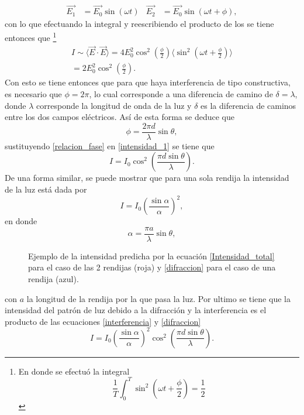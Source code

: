 \documentclass[%
 reprint,
 amsmath,amssymb,
 aps,
]{revtex4-1}
\begin{document}
\begin{align}
\vec{E_1}&=\vec{E_0}\sin(\omega t)   &  \vec{E_2}&=\vec{E_0}\sin(\omega t+ \phi),
\label{campos electricos}
\end{align}
con lo que efectuando la integral y reescribiendo el producto de los  se tiene entonces que \footnote{En donde se efectuó la integral
\[ \frac{1}{T}\int_{0}^{T}\sin^2\left(\omega t+\frac{\phi}{2}\right)=\frac{1}{2}\]
}
\begin{multline}
I\sim  \langle \vec{E}\cdot \vec{E}\rangle = 4E_0^2 \cos^2\left(\frac{\phi}{2}\right)\langle\sin^2\left(\omega t+\frac{\phi}{2}\right)\rangle \\
=2E_0^2\cos^2\left(\frac{\phi}{2}\right).
\label{intensidad_1}
\end{multline}
Con esto se tiene entonces que para que haya interferencia de tipo constructiva, es necesario que $\phi=2\pi$, lo cual corresponde a una diferencia de camino de $\delta=\lambda$, donde $\lambda$ corresponde la longitud de onda de la luz y $\delta$ es la diferencia de caminos entre los dos campos eléctricos. Así de esta forma se deduce que
\begin{equation}
\phi = \frac{2\pi d}{\lambda}\sin\theta,
\label{relacion_fase}
\end{equation}
sustituyendo \eqref{relacion_fase} en \eqref{intensidad_1} se tiene que
\begin{equation}
I=I_0\cos^2\left(\frac{\pi d \sin\theta}{\lambda}\right).
\label{interferencia}
\end{equation}
De una forma similar, se puede mostrar que para una sola rendija la intensidad  de la luz está dada por
\begin{equation}
I=I_0\left(\frac{\sin\alpha}{\alpha}\right)^2,
\label{difraccion}
\end{equation}
en donde
\begin{equation}
\alpha=\frac{\pi a}{\lambda}\sin\theta,
\end{equation}
\begin{figure}[h]
\caption{\label{ejemplo interferencia} Ejemplo de la intensidad predicha por la ecuación \eqref{Intensidad_total} para el caso de las 2 rendijas (roja) y \eqref{difraccion} para el caso de una rendija (azul).}
\end{figure}
con $a$ la longitud de la rendija por la que pasa la luz. Por ultimo se tiene que la intensidad del patrón de luz debido a la difracción y la interferencia es el producto de las ecuaciones \eqref{interferencia} y \eqref{difraccion}
\begin{equation}
I=I_0\left(\frac{\sin\alpha}{\alpha}\right)^2\cos^2\left(\frac{\pi d \sin\theta}{\lambda}\right).
\label{Intensidad_total}
\end{equation}
\end{document}
